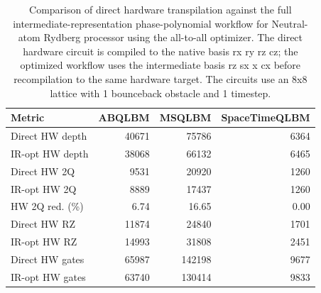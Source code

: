 \begin{table}[ht]
\centering
\begin{tabular}{lrrr}
\hline
Metric & ABQLBM & MSQLBM & SpaceTimeQLBM \\
\hline
Direct HW depth & 40671 & 75786 & 6364 \\
IR-opt HW depth & 38068 & 66132 & 6465 \\
Direct HW 2Q & 9531 & 20920 & 1260 \\
IR-opt HW 2Q & 8889 & 17437 & 1260 \\
HW 2Q red. (\%) & 6.74 & 16.65 & 0.00 \\
Direct HW RZ & 11874 & 24840 & 1701 \\
IR-opt HW RZ & 14993 & 31808 & 2451 \\
Direct HW gates & 65987 & 142198 & 9677 \\
IR-opt HW gates & 63740 & 130414 & 9833 \\
\hline
\end{tabular}
\caption{Comparison of direct hardware transpilation against the full intermediate-representation phase-polynomial workflow for Neutral-atom Rydberg processor using the all-to-all optimizer. The direct hardware circuit is compiled to the native basis rx ry rz cz; the optimized workflow uses the intermediate basis rz sx x cx before recompilation to the same hardware target. The circuits use an 8x8 lattice with 1 bounceback obstacle and 1 timestep.}
\label{tab:phase-poly-ir-flow-comparison-8x8-obs1-t1-aws-2023-all-to-all}
\end{table}
